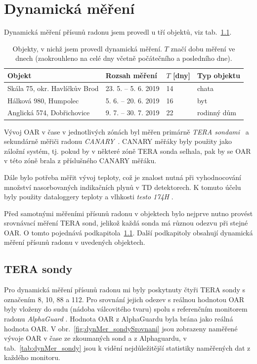 \chapter{Dynamická měření}
Dynamická měření přísunů radonu jsem provedl u tří objektů, viz tab.~\ref{tab:dynMer_prehled}.
\begin{table}[ht]
	\centering
	\caption{Objekty, v nichž jsem provedl dynamická měření. $T$ značí dobu měření ve dnech (zaokrouhleno na celé dny včetně počátečního a posledního dne).}
	\label{tab:dynMer_prehled}
	\begin{tabular}{llll}
		\toprule
		Objekt & Rozsah měření & $T$ [dny] & Typ objektu\\
		\midrule
		Skála 75, okr. Havlíčkův Brod & 23. 5. -- 5. 6. 2019 & 14 & chata\\
		Hálková 980, Humpolec & 5. 6. -- 20. 6. 2019 & 16 & byt\\
		Anglická 574, Dobřichovice & 9. 7. -- 30. 7. 2019 & 22 & rodinný dům\\
		\bottomrule
	\end{tabular}
\end{table}

Vývoj OAR v čase v jednotlivých zónách byl měřen primárně \emph{TERA sondami}~\cite{tera} a sekundárně měřiči radonu \emph{CANARY}~\cite{canary}. CANARY měřáky byly použity jako záložní systém, tj. pokud by v některé zóně  TERA sonda selhala, pak by se OAR v této zóně brala z příslušného CANARY měřáku. %

Dále bylo potřeba měřit vývoj teploty, což je znalost nutná při vyhodnocování množství nasorbovaných indikačních plynů v TD detektorech. K tomuto účelu byly použity dataloggery teploty a vlhkosti \emph{testo 174H} \cite{testo}.

Před samotnými měřeními přísunů radonu v objektech bylo nejprve nutno provést srovnávací měření TERA sond, jelikož každá sonda má různou odezvu při stejné OAR. O tomto pojednává podkapitola~\ref{navesti:dynMer_TERA}. Další podkapitoly obsahují dynamická měření přísunů radonu v uvedených objektech. 
\section{TERA sondy}\label{navesti:dynMer_TERA}
Pro dynamická měření přísunů radonu mi byly poskytnuty čtyři TERA sondy s označením 8, 10, 88 a 112. Pro srovnání jejich odezev s reálnou hodnotou OAR byly vloženy do sudu (nádoba válcovitého tvaru) spolu s referenčním monitorem radonu \emph{AlphaGuard} \cite{alphaguard}. Hodnota OAR z AlphaGuardu byla brána jako reálná hodnota OAR. V obr.~\ref{fig:dynMer_sondySrovnani} jsou zobrazeny naměřené vývoje OAR v čase ze zkoumaných sond a z Alphaguardu, v tab.~\ref{tab:dynMer_sondy} jsou k vidění nejdůležitější statistiky naměřených dat z každého monitoru.

